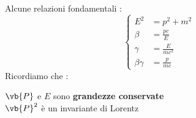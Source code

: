 \documentclass[a4paper, 12pt, twoside]{report}
\begin{document}
\begin{tcolorbox}[colback=red!5!white,colframe=red!50!black,title=ATTENZIONE !]
Alcune relazioni fondamentali : 
\begin{equation*}
        \left\{\begin{aligned}
        E^2 &= \textit{p}^2 + m^2\\
        \beta &=\frac{\textit{p}c}{E}\\ 
        \gamma &= \frac{E}{mc^2} \\
        \beta\gamma &= \frac{p}{mc}
\end{aligned}
\right.
\end{equation*}
Ricordiamo che : 
\begin{center} $\vb{P}$ e $E$ sono \textbf{grandezze conservate} \\ $\vb{P}^2$ è un invariante di Lorentz\end{center}
\end{tcolorbox}
\end{document}
